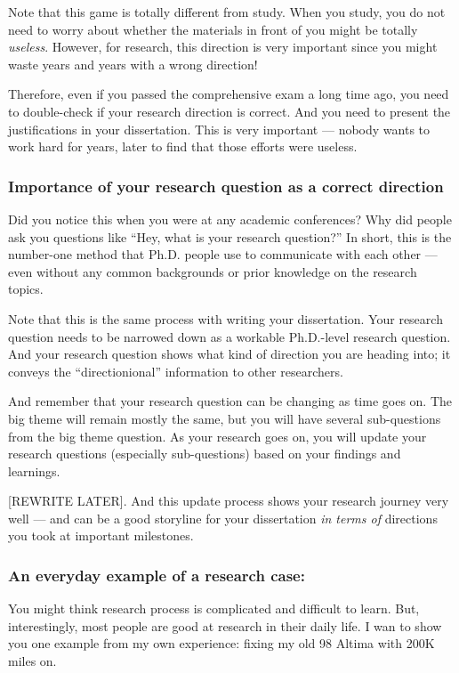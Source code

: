 \documentclass[11pt]{article}
\begin{document}
Note that this game is totally different from study. When you study, you do
not need to worry about whether the materials in front of you might be totally
\emph{useless}. However, for research, this direction is very important since
you might waste years and years with a wrong direction!

Therefore, even if you passed the comprehensive exam a long time ago, you need
to double-check if your research direction is correct. And you need to present
the justifications in your dissertation. This is very important --- nobody
wants to work hard for years, later to find that those efforts were useless. 


\subsubsection{Importance of your research question as a correct direction}

Did you notice this when you were at any academic conferences? Why did people
ask you questions like ``Hey, what is your research question?'' In short, this
is the number-one method that Ph.D. people use to communicate with each other
--- even without any common backgrounds or prior knowledge on the research
topics.

Note that this is the same process with writing your dissertation.  Your
research question needs to be narrowed down as a workable Ph.D.-level research
question. And your research question shows what kind of direction you are
heading into; it conveys the ``directionional'' information to other researchers.

And remember that your research question can be changing as time goes on. The
big theme will remain mostly the same, but you will have several sub-questions
from the big theme question. As your research goes on, you will update your
research questions (especially sub-questions) based on your findings and
learnings. 

[REWRITE LATER]. And this update process shows your research journey very well
--- and can be a good storyline for your dissertation \emph{in terms of}
directions you took at important milestones. 

\subsubsection{An everyday example of a research case:}
You might think research process is complicated and difficult to learn.
But, interestingly, most people are good at research in their daily life.
I wan to show you one example from my own experience: fixing my old 98
Altima with 200K miles on.
\end{document}
